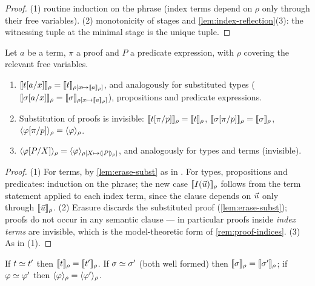 \begin{proof}
(1) routine induction on the phrase (index terms depend on $\rho$ only
through their free variables).  (2) monotonicity of stages and
\cref{lem:index-reflection}(3): the witnessing tuple at the minimal
stage is the unique tuple.
\end{proof}

\begin{lemma}
\label{lem:sem-subst}
Let $a$ be a term, $\pi$ a proof and $P$ a predicate expression, with
$\rho$ covering the relevant free variables.
\begin{enumerate}[leftmargin=2em]
\item $[\![ t[a/x] ]\!]_\rho = [\![ t ]\!]_{\rho[x \mapsto
  [\![ a ]\!]_\rho]}$, and analogously for substituted types
  ($[\![ \sigma[a/x] ]\!]_{\rho} = [\![ \sigma ]\!]_{\rho[x \mapsto
  [\![ a ]\!]_\rho]}$), propositions and predicate expressions.
\item Substitution of proofs is invisible:
  $[\![ t[\pi/p] ]\!]_\rho = [\![ t ]\!]_\rho$,
  $[\![ \sigma[\pi/p] ]\!]_{\rho} = [\![ \sigma ]\!]_{\rho}$,
  $\langle \varphi[\pi/p] \rangle_{\rho} = \langle \varphi \rangle_{\rho}$.
\item $\langle \varphi[P/X] \rangle_{\rho} = \langle \varphi \rangle_{\rho[X \mapsto
  (\!| P |\!)_\rho]}$, and analogously for types and terms (invisible).
\end{enumerate}
\end{lemma}

\begin{proof}
(1) For terms, by \cref{lem:erase-subst} as in \cite{Extraction2026}.
For types, propositions and predicates: induction on the phrase; the
new case $[\![ I(\vec{u}) ]\!]_{\rho}$ follows from the term statement
applied to each index term, since the clause depends on $\vec{u}$ only
through $[\![ \vec{u} ]\!]_\rho$.  (2) Erasure discards the substituted
proof (\cref{lem:erase-subst}); proofs do not occur in any semantic
clause --- in particular proofs inside \emph{index terms} are invisible,
which is the model-theoretic form of \cref{rem:proof-indices}.  (3) As
in (1).
\end{proof}

\begin{lemma}
\label{lem:conv-inv}
If $t \simeq t'$ then $[\![ t ]\!]_\rho = [\![ t' ]\!]_\rho$.  If $\sigma \simeq
\sigma'$ (both well formed) then $[\![ \sigma ]\!]_{\rho} =
[\![ \sigma' ]\!]_{\rho}$; if $\varphi \simeq \varphi'$ then
$\langle \varphi \rangle_{\rho} = \langle \varphi' \rangle_{\rho}$.
\end{lemma}

